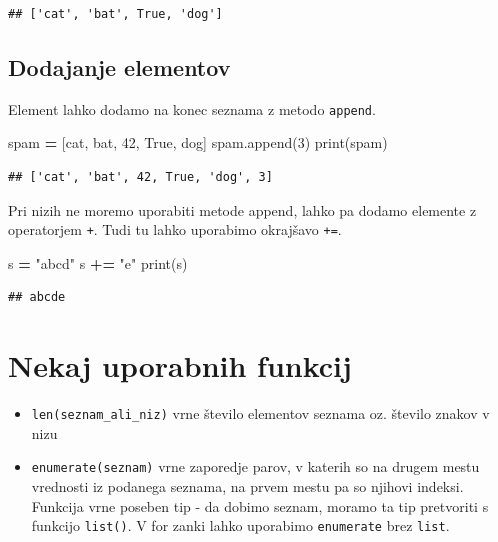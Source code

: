 \documentclass[
]{report}
\newenvironment{Shaded}{\begin{snugshade}}{\end{snugshade}}
\newcommand{\BuiltInTok}[1]{#1}
\newcommand{\DecValTok}[1]{\textcolor[rgb]{0.00,0.00,0.81}{#1}}
\newcommand{\NormalTok}[1]{#1}
\newcommand{\OperatorTok}[1]{\textcolor[rgb]{0.81,0.36,0.00}{\textbf{#1}}}
\newcommand{\StringTok}[1]{\textcolor[rgb]{0.31,0.60,0.02}{#1}}
\newcommand{\VariableTok}[1]{\textcolor[rgb]{0.00,0.00,0.00}{#1}}
\begin{document}
\begin{verbatim}
## ['cat', 'bat', True, 'dog']
\end{verbatim}

\hypertarget{dodajanje-elementov}{%
\subsection{Dodajanje elementov}\label{dodajanje-elementov}}

Element lahko dodamo na konec seznama z metodo \texttt{append}.

\begin{Shaded}
\begin{Highlighting}[]
\NormalTok{spam }\OperatorTok{=}\NormalTok{ [}\StringTok{\textquotesingle{}cat\textquotesingle{}}\NormalTok{, }\StringTok{\textquotesingle{}bat\textquotesingle{}}\NormalTok{, }\DecValTok{42}\NormalTok{, }\VariableTok{True}\NormalTok{, }\StringTok{\textquotesingle{}dog\textquotesingle{}}\NormalTok{]}
\NormalTok{spam.append(}\DecValTok{3}\NormalTok{)}
\BuiltInTok{print}\NormalTok{(spam)}
\end{Highlighting}
\end{Shaded}

\begin{verbatim}
## ['cat', 'bat', 42, True, 'dog', 3]
\end{verbatim}

Pri nizih ne moremo uporabiti metode append, lahko pa dodamo elemente z operatorjem \texttt{+}. Tudi tu lahko uporabimo okrajšavo \texttt{+=}.

\begin{Shaded}
\begin{Highlighting}[]
\NormalTok{s }\OperatorTok{=} \StringTok{"abcd"}
\NormalTok{s }\OperatorTok{+=} \StringTok{"e"}
\BuiltInTok{print}\NormalTok{(s)}
\end{Highlighting}
\end{Shaded}

\begin{verbatim}
## abcde
\end{verbatim}

\hypertarget{nekaj-uporabnih-funkcij}{%
\section{Nekaj uporabnih funkcij}\label{nekaj-uporabnih-funkcij}}

\begin{itemize}
\item
  \texttt{len(seznam\_ali\_niz)} vrne število elementov seznama oz. število znakov v nizu
\item
  \texttt{enumerate(seznam)} vrne zaporedje parov, v katerih so na drugem mestu vrednosti iz podanega seznama, na prvem mestu pa so njihovi indeksi.
  Funkcija vrne poseben tip - da dobimo seznam, moramo ta tip
  pretvoriti s funkcijo \texttt{list()}. V for zanki lahko uporabimo \texttt{enumerate} brez \texttt{list}.
\end{itemize}
\end{document}

